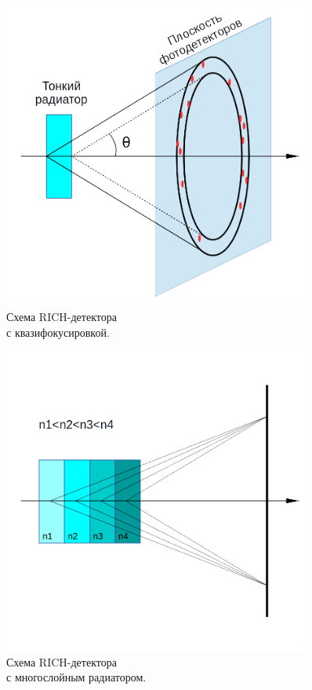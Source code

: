 \begin{minipage}[t]{0.495\textwidth}
\begin{figure}[H]
\includegraphics[width=0.9\textwidth]{pictures/RICH_scheme.png}
\caption{Схема RICH-детектора \\с квазифокусировкой.}
\label{fig:RICHbasic}
\end{figure}
\end{minipage}
\begin{minipage}[t]{0.495\textwidth}
\begin{figure}[H]
\includegraphics[width=0.9\textwidth]{pictures/RICH_layered.png}
\caption{Схема RICH-детектора \\с многослойным радиатором.}
\label{fig:RICHlayered}
\end{figure}
\end{minipage}

